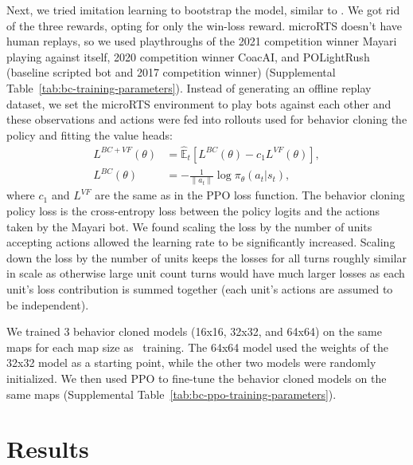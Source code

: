 \documentclass[conference]{IEEEtran}
\begin{document}
Next, we tried imitation learning to bootstrap the model, similar to
\cite{Vinyals2019GrandmasterLI}. We got rid of the three rewards, opting for only the
win-loss reward. microRTS doesn't have human replays, so we used playthroughs of the
2021 competition winner Mayari playing against itself, 2020 competition winner CoacAI, 
and POLightRush (baseline scripted bot and 2017 competition winner) (Supplemental Table~\ref{tab:bc-training-parameters}). Instead of
generating an offline replay dataset, we set the microRTS environment to play bots
against each other and these observations and actions were fed into rollouts used for
behavior cloning the policy and fitting the value heads:
\begin{align}
    L^{BC+VF}(\theta) &= \hat{\mathbb{E}}_t \left[ L^{BC}(\theta) - c_1 L^{VF}(\theta) \right], \\
    L^{BC}(\theta) &= -\frac{1}{\|a_t\|} \log \pi_{\theta}(a_t|s_t),
\end{align}
where $c_1$ and $L^{VF}$ are the same as in the PPO loss function. The behavior cloning
policy loss is the cross-entropy loss between the policy logits and the actions taken by
the Mayari bot. We found scaling the loss by the number of units accepting actions
allowed the learning rate to be significantly increased. Scaling down the loss by the
number of units keeps the losses for all turns roughly similar in scale as otherwise
large unit count turns would have much larger losses as each unit's loss contribution is
summed together (each unit's actions are assumed to be independent).

We trained 3 behavior cloned models (16x16, 32x32, and 64x64) on the same maps for each
map size as \agentName\ training. The 64x64 model used the weights of the 32x32 model 
as a starting point, while the other two models were randomly initialized. We then used 
PPO to fine-tune the behavior cloned models on the same maps (Supplemental Table~\ref{tab:bc-ppo-training-parameters}).

\section{Results}
\end{document}

